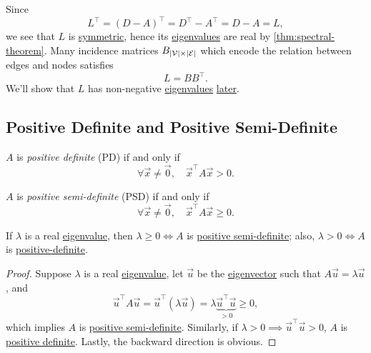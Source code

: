 \begin{remark}
	Since
	\[
		L^{\top} = (D - A)^{\top} = D^{\top} - A^{\top} = D - A = L,
	\]
	we see that \(L\) is \hyperref[def:symmetric-matrix]{symmetric}, hence its \hyperref[def:eigenvalue]{eigenvalues} are real by \autoref{thm:spectral-theorem}. Many incidence matrices \(B_{\left\vert \mathcal{\MakeUppercase{v}} \right\vert \times \left\vert \mathcal{\MakeUppercase{e}} \right\vert }\) which encode the relation between edges and nodes satisfies
	\[
		L = BB^{\top}.
	\]
	We'll show that \(L\) has non-negative \hyperref[def:eigenvalue]{eigenvalues} \hyperref[rmk:property-of-Laplacian]{later}.
\end{remark}
\subsection{Positive Definite and Positive Semi-Definite}
\begin{definition}\label{def:positive-definite}
	\(A \) is \emph{positive definite} (PD) if and only if
	\[
		\forall \vec{x} \neq  \vec{0},\quad \vec{x}^{\top}A \vec{x} > 0.
	\]
\end{definition}

\begin{definition}\label{def:positive-semi-definite}
	\(A \) is \emph{positive semi-definite} (PSD) if and only if
	\[
		\forall \vec{x} \neq  \vec{0},\quad \vec{x}^{\top}A \vec{x} \geq  0.
	\]
\end{definition}

\begin{lemma}\label{lma:lec8-1}
	If \(\lambda\) is a real \hyperref[def:eigenvalue]{eigenvalue}, then \(\lambda \geq  0 \iff A\) is \hyperref[def:positive-semi-definite]{positive semi-definite}; also, \(\lambda > 0 \iff A\) is \hyperref[def:positive-definite]{positive-definite}.
\end{lemma}
\begin{proof}
	Suppose \(\lambda\) is a real \hyperref[def:eigenvalue]{eigenvalue}, let \(\vec{u}\) be the \hyperref[def:eigenvector]{eigenvector} such that \(A \vec{u} = \lambda \vec{u}\), and
	\[
		\vec{u}^{\top} A \vec{u} = \vec{u}^{\top} (\lambda \vec{u}) = \lambda \underbrace{\vec{u}^{\top}\vec{u}}_{>0} \geq 0,
	\]
	which implies \(A\) is \hyperref[def:positive-semi-definite]{positive semi-definite}. Similarly, if \(\lambda > 0 \implies \vec{u}^{\top} \vec{u} > 0\), \(A\) is \hyperref[def:positive-definite]{positive definite}. Lastly, the backward direction is obvious.
\end{proof}

